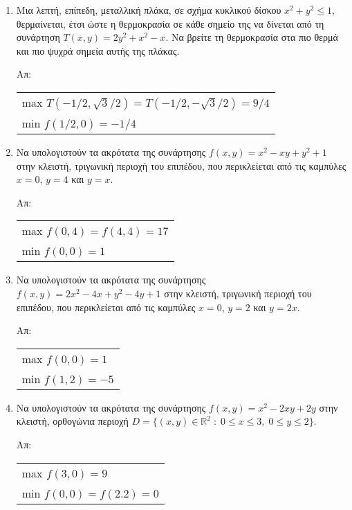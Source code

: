 \begin{enumerate}
  \item Μια λεπτή, επίπεδη, μεταλλική πλάκα, σε σχήμα κυκλικού δίσκου 
    $ x^{2}+y^2 \leq 1 $, θερμαίνεται, έτσι ώστε η θερμοκρασία σε κάθε σημείο της να 
    δίνεται από τη συνάρτηση 
    $ T(x,y) = 2y^{2}+x^{2}-x $.
    Να βρείτε τη θερμοκρασία στα πιο θερμά και πιο ψυχρά σημεία αυτής της πλάκας.

    \hfill Απ:  
    \begin{tabular}{l}
      max $ T(-1/2, \sqrt{3} /2) = T(-1/2, - \sqrt{3} /2) = 9/4 $ \\
      min $ f(1/2,0) = -1/4 $ 
    \end{tabular}

  \item Να υπολογιστούν τα ακρότατα της συνάρτησης $ f(x,y) = x^{2}-xy+y^{2}+1 $ 
    στην κλειστή, τριγωνική περιοχή του επιπέδου, που περικλείεται από τις καμπύλες 
    $ x=0 $, $ y=4 $ και $ y=x $.

    \hfill Απ:  
    \begin{tabular}{l}
      max $ f(0,4) = f(4,4) = 17 $ \\
      min $ f(0,0) = 1 $ 
    \end{tabular}

  \item Να υπολογιστούν τα ακρότατα της συνάρτησης $ f(x,y) = 2x^{2}-4x+y^{2}-4y+1 $ 
    στην κλειστή, τριγωνική περιοχή του επιπέδου, που περικλείεται από τις καμπύλες 
    $ x=0 $, $ y=2 $ και $ y=2x $.

    \hfill Απ:  
    \begin{tabular}{l}
      max $ f(0,0) = 1 $ \\
      min $ f(1,2) = -5 $ 
    \end{tabular}

  \item Να υπολογιστούν τα ακρότατα της συνάρτησης $ f(x,y) = x^{2}-2xy+2y $ 
    στην κλειστή, ορθογώνια περιοχή $ D = \{ (x,y) \in \mathbb{R}^{2} \; : \; 0 \leq x
    \leq 3, \; 0 \leq y \leq 2 \} $.

    \hfill Απ:  
    \begin{tabular}{l}
      max $ f(3,0) = 9 $ \\
      min $ f(0,0) = f(2.2) = 0 $ 
    \end{tabular}
\end{enumerate}





